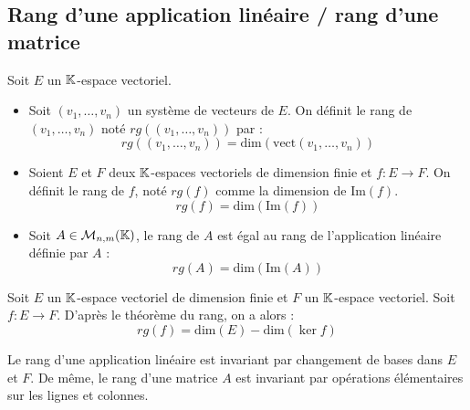 \subsection{Rang d'une application linéaire / rang d'une matrice}

\begin{definition}[Rang]
    Soit $E$ un $\mathbb{K}$-espace vectoriel. 
    \begin{itemize}
        \item Soit $(v_1, \dots, v_n)$ un système de vecteurs de $E$. 
        On définit le rang de $(v_1, \dots, v_n)$ noté $ rg((v_1, \dots, v_n))$ par : 
            \[ rg((v_1, \dots, v_n)) = \text{dim}(\text{vect}(v_1, \dots, v_n)) \] 
        \item Soient $E$ et $F$ deux $\mathbb{K}$-espaces vectoriels de dimension finie et $f : E \longrightarrow F$. 
            On définit le rang de $f$, noté $rg(f)$ comme la dimension de $ \text{Im}(f)$. 
                \[ rg(f) = \text{dim}( \text{Im}(f)) \] 
        \item Soit $A \in \mathcal{M}_{n,m}(\mathbb{K})$, le rang de $A$ est égal au rang de l'application linéaire 
            définie par $A$ : 
                \[ rg(A) = \text{dim}( \text{Im}(A)) \] 
    \end{itemize}
\end{definition}

\begin{remark}
    Soit $E$ un $\mathbb{K}$-espace vectoriel de dimension finie et $F$ un $\mathbb{K}$-espace vectoriel. 
    Soit $f : E \longrightarrow F$. D'après le théorème du rang, on a alors : 
        \[ rg(f) = \text{dim}(E) - \text{dim}(\ker f) \]  
\end{remark}

\begin{theorem}
    Le rang d'une application linéaire est invariant par changement de bases dans $E$ et $F$. 
    De même, le rang d'une matrice $A$ est invariant par opérations élémentaires sur les lignes et colonnes.
\end{theorem}





